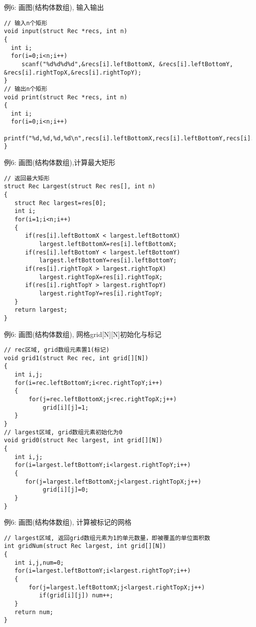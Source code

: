 \begin{frame}{例6: 画图(结构体数组), 输入输出}
\begin{lstlisting}
// 输入n个矩形
void input(struct Rec *recs, int n)
{
  int i;
  for(i=0;i<n;i++) 
     scanf("%d%d%d%d",&recs[i].leftBottomX, &recs[i].leftBottomY, &recs[i].rightTopX,&recs[i].rightTopY);
}
// 输出n个矩形
void print(struct Rec *recs, int n)
{
  int i;
  for(i=0;i<n;i++) 
    printf("%d,%d,%d,%d\n",recs[i].leftBottomX,recs[i].leftBottomY,recs[i].rightTopX,recs[i].rightTopY);
} 
\end{lstlisting}
\medskip
\end{frame}

\begin{frame}{例6: 画图(结构体数组),计算最大矩形}
\begin{lstlisting}
// 返回最大矩形
struct Rec Largest(struct Rec res[], int n)
{
   struct Rec largest=res[0];
   int i;
   for(i=1;i<n;i++)
   {
      if(res[i].leftBottomX < largest.leftBottomX)
          largest.leftBottomX=res[i].leftBottomX;
      if(res[i].leftBottomY < largest.leftBottomY)
          largest.leftBottomY=res[i].leftBottomY;
      if(res[i].rightTopX > largest.rightTopX) 
          largest.rightTopX=res[i].rightTopX;
      if(res[i].rightTopY > largest.rightTopY) 
          largest.rightTopY=res[i].rightTopY;
   }
   return largest; 
} 
\end{lstlisting}
\end{frame}

\begin{frame}{例6: 画图(结构体数组), 网格grid[N][N]初始化与标记}
\begin{lstlisting}
// rec区域, grid数组元素置1(标记) 
void grid1(struct Rec rec, int grid[][N])
{
   int i,j;
   for(i=rec.leftBottomY;i<rec.rightTopY;i++)
   {
       for(j=rec.leftBottomX;j<rec.rightTopX;j++)
           grid[i][j]=1;
   } 
}
// largest区域, grid数组元素初始化为0 
void grid0(struct Rec largest, int grid[][N])
{
   int i,j;
   for(i=largest.leftBottomY;i<largest.rightTopY;i++)
   {
      for(j=largest.leftBottomX;j<largest.rightTopX;j++)
           grid[i][j]=0;
   } 
}
\end{lstlisting}
\end{frame}

\begin{frame}{例6: 画图(结构体数组), 计算被标记的网格}
\begin{lstlisting}
// largest区域, 返回grid数组元素为1的单元数量，即被覆盖的单位面积数 
int gridNum(struct Rec largest, int grid[][N])
{
   int i,j,num=0;
   for(i=largest.leftBottomY;i<largest.rightTopY;i++)
   {
       for(j=largest.leftBottomX;j<largest.rightTopX;j++)
          if(grid[i][j]) num++;
   } 
   return num;
}
\end{lstlisting}
\end{frame}

